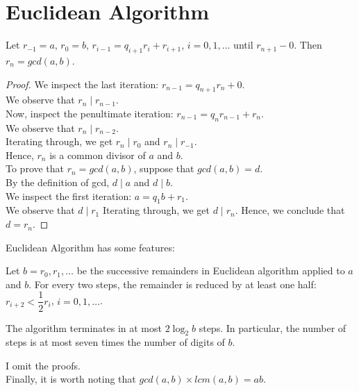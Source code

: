 \section{Euclidean Algorithm}

\begin{theorem}
Let $r_{-1} = a$, $r_{0} = b$, $r_{i - 1} = q_{i + 1}r_{i} + r_{i + 1}$, $i = 0, 1,\dots$ until $r_{n + 1} - 0$. Then $r_{n} = gcd(a, b)$.
\end{theorem}

\begin{proof}
We inspect the last iteration: $r_{n - 1} = q_{n + 1}r_{n} + 0$. \\
We observe that $r_{n}\mid r_{n - 1}$. \\
Now, inspect the penultimate iteration: $r_{n - 1} = q_{n}r_{n - 1} + r_{n}$. \\
We observe that $r_{n}\mid r_{n - 2}$. \\
Iterating through, we get $r_{n}\mid r_{0}$ and $r_{n}\mid r_{-1}$. \\
Hence, $r_{n}$ is a common divisor of $a$ and $b$. \\
To prove that $r_{n} = gcd(a, b)$, suppose that $gcd(a, b) = d$. \\
By the definition of gcd, $d\mid a$ and $d\mid b$. \\
We inspect the first iteration: $a = q_{1}b + r_{1}$. \\
We observe that $d\mid r_{1}$
Iterating through, we get $d\mid r_{n}$. Hence, we conclude that $d = r_{n}$.
\end{proof}

Euclidean Algorithm has some features:

\begin{observation}
Let $b = r_{0}, r_{1}, \dots$ be the successive remainders in Euclidean algorithm applied to $a$ and $b$. For every two steps, the remainder is reduced by at least one half: $r_{i + 2} < \dfrac{1}{2}r_{i}$, $i = 0, 1, \dots$.
\end{observation}

\begin{observation}
The algorithm terminates in at most $2\log_{2}b$ steps. In particular, the number of steps is at most seven times the number of digits of $b$.
\end{observation}

\noindent
I omit the proofs. \\
Finally, it is worth noting that $gcd(a, b)\times lcm(a, b) = ab$.